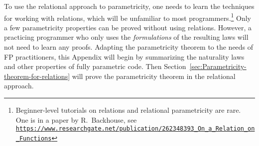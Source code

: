 To use the relational approach to parametricity, one needs to learn
the techniques for working with relations, which will be unfamiliar
to most programmers.\footnote{Beginner-level tutorials on relations and relational parametricity
are rare. One is in a paper by R.~Backhouse,
see \texttt{\href{https://www.researchgate.net/publication/262348393_On_a_Relation_on_Functions}{https://www.researchgate.net/publication/262348393\_On\_a\_Relation\_on\_Functions}}} Only a few parametricity properties can be proved without using relations.
However, a practicing programmer who only uses the \emph{formulations}
of the resulting laws will not need to learn any proofs. Adapting
the parametricity theorem to the needs of FP practitioners, this Appendix
will begin by summarizing the naturality laws and other properties
of fully parametric code. Then Section~\ref{sec:Parametricity-theorem-for-relations}
will prove the parametricity theorem in the relational approach. %
\begin{comment}
Section~\ref{sec:Commutativity-laws-for-type-constructors} proves
that fully parametric type constructors obey commutativity laws. Section~\ref{sec:Naturality-laws-for-fully-parametric-functions}
shows, without using relations, that fully parametric functions satisfy
dinaturality laws (a generalization of naturality laws to arbitrary
type signatures). An important consequence, proved in Section~\ref{sec:Uniqueness-of-functor-and-contrafunctor},
is that the code implementing the functor and contrafunctor typeclasses
is unique. Finally, Section~\ref{sec:Parametricity-theorem-for-relations}
explains the relational approach to parametricity and proves the relational
parametricity theorem. 

Additional literature:

{[}1{]}: Girard, J.-Y.; Scedrov, A. \& Scott, P. J. Normal Forms and
Cut-Free Proofs as Natural Transformations. Logic From Computer Science,
Mathematical Science Research Institute Publications 21, Springer-Verlag,
1992, 217-241. http://citeseer.ist.psu.edu/viewdoc/summary?doi=10.1.1.41.811

{[}2{]}: Bainbridge, E. S.; Freyd, P. J.; Scedrov, A. \& Scott, P.
J. Functorial polymorphism. Theoretical computer science, Elsevier,
1990, 70, 35-64. https://core.ac.uk/display/82270459

{[}3{]}: De Lataillade, J. Dinatural Terms in System F. Logic in Computer
Science, 24th Annual IEEE Symposium, 267-276, 2009. https://www.irif.fr/\textasciitilde delatail/dinat.pdf

{[}4{]}: Pistone, P. On completeness and parametricity in the realizability
semantics of System F. https://arxiv.org/abs/1802.05143

{[}5{]}: https://libres.uncg.edu/ir/asu/f/Johann\_Patricia\_2014\_A\_Relationally\_Parametric\_Model\_Of\_Dependent\_Type\_Theory..pdf

See discussion here: https://cstheory.stackexchange.com/questions/42256/is-case-analysis-on-normal-forms-of-lambda-terms-sufficient-to-prove-parametrici
\end{comment}

